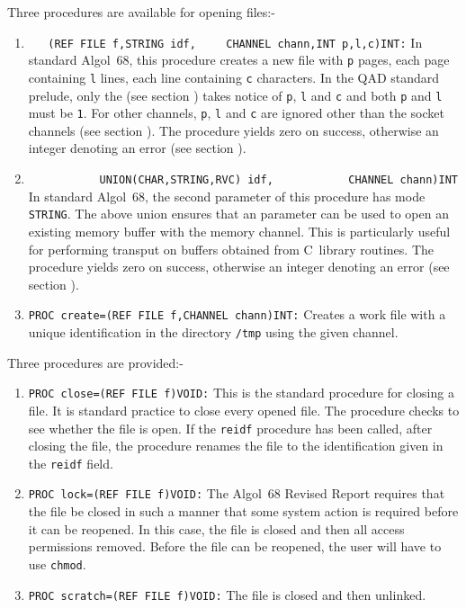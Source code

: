 Three procedures are available for opening files:-
\begin{enumerate}
\item {}\newline
      \verb|   (REF FILE f,STRING idf,|\newline
      \verb|    CHANNEL chann,INT p,l,c)INT:|\newline
In standard Algol~68, this procedure creates a new file with \verb|p|
pages, each page containing \verb|l| lines, each line containing
\verb|c| characters. In the QAD standard prelude, only the
 (see section ) takes notice of
\verb|p|, \verb|l| and \verb|c| and both \verb|p| and \verb|l| must
be \verb|1|. For other channels, \verb|p|, \verb|l| and \verb|c| are
ignored other than the socket channels (see section
). The procedure yields zero on success, otherwise
an integer denoting an error (see section ).
\item {}\newline
      \verb|           UNION(CHAR,STRING,RVC) idf,|\newline
      \verb|           CHANNEL chann)INT|\newline
In standard Algol~68, the second parameter of this procedure has mode
\verb|STRING|. The above union ensures that an  parameter can
be used to open an existing memory buffer with the memory channel. This
is particularly useful for performing transput on buffers obtained from
C~library routines. The procedure yields zero on success, otherwise an
integer denoting an error (see section ).
\item \verb|PROC create=(REF FILE f,CHANNEL chann)INT:|\newline
Creates a work file with a unique identification in the directory
\verb|/tmp| using the given channel.
\end{enumerate}

\pagebreak
{}
Three procedures are provided:-
\begin{enumerate}
\item \verb|PROC close=(REF FILE f)VOID:|\newline
This is the standard procedure for closing a file. It is standard
practice to close every opened file. The procedure checks to see
whether the file is open. If the \verb|reidf| procedure has been
called, after closing the file, the procedure renames the file to the
identification given in the \verb|reidf| field.
\item \verb|PROC lock=(REF FILE f)VOID:|\newline
The Algol~68 Revised Report requires that the file be closed in such a
manner that some system action is required before it can be reopened.
In this case, the file is closed and then all access permissions
removed. Before the file can be reopened, the user will have to use
\verb|chmod|.
\item \verb|PROC scratch=(REF FILE f)VOID:|\newline
The file is closed and then unlinked.
\end{enumerate}

